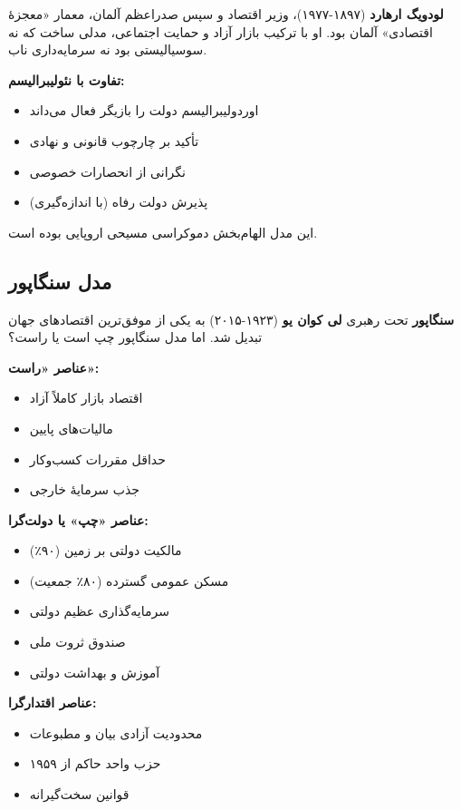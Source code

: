 \textbf{لودویگ ارهارد} (۱۸۹۷-۱۹۷۷)، وزیر اقتصاد و سپس صدراعظم آلمان، معمار «معجزهٔ اقتصادی» آلمان بود. او با ترکیب بازار آزاد و حمایت اجتماعی، مدلی ساخت که نه سوسیالیستی بود نه سرمایه‌داری ناب.

\textbf{تفاوت با نئولیبرالیسم:}
\begin{itemize}
    \item اوردولیبرالیسم دولت را بازیگر فعال می‌داند
    \item تأکید بر چارچوب قانونی و نهادی
    \item نگرانی از انحصارات خصوصی
    \item پذیرش دولت رفاه (با اندازه‌گیری)
\end{itemize}

این مدل الهام‌بخش دموکراسی مسیحی اروپایی بوده است.


\subsection{مدل سنگاپور}


\textbf{سنگاپور} تحت رهبری \textbf{لی کوان یو} (۱۹۲۳-۲۰۱۵) به یکی از موفق‌ترین اقتصادهای جهان تبدیل شد. اما مدل سنگاپور چپ است یا راست؟

\textbf{عناصر «راست»:}
\begin{itemize}
    \item اقتصاد بازار کاملاً آزاد
    \item مالیات‌های پایین
    \item حداقل مقررات کسب‌وکار
    \item جذب سرمایهٔ خارجی
\end{itemize}

\textbf{عناصر «چپ» یا دولت‌گرا:}
\begin{itemize}
    \item مالکیت دولتی بر زمین (۹۰٪)
    \item مسکن عمومی گسترده (۸۰٪ جمعیت)
    \item سرمایه‌گذاری عظیم دولتی
    \item صندوق ثروت ملی
    \item آموزش و بهداشت دولتی
\end{itemize}

\textbf{عناصر اقتدارگرا:}
\begin{itemize}
    \item محدودیت آزادی بیان و مطبوعات
    \item حزب واحد حاکم از ۱۹۵۹
    \item قوانین سخت‌گیرانه
\end{itemize}

